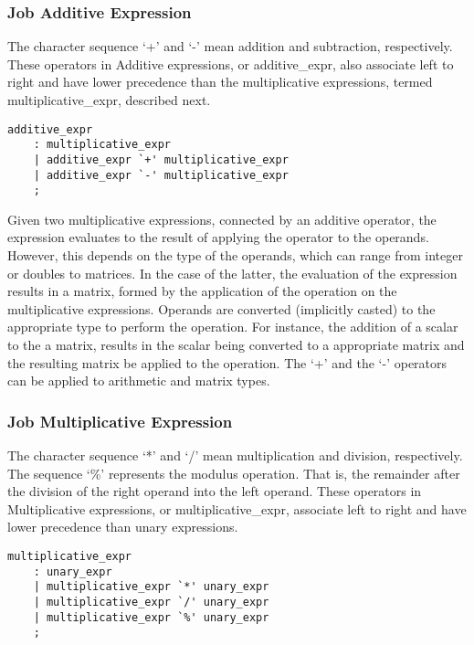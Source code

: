 \documentclass[prodmode,acmtecs]{acmsmall}
\begin{document}

\subsubsection{Job Additive Expression}

The character sequence `+' and `-' mean addition and subtraction, 
respectively. These operators in Additive expressions, or additive\_expr, 
also associate left to right and have lower precedence than the 
multiplicative expressions, termed multiplicative\_expr, described next.

\begin{lstlisting}
additive_expr
	: multiplicative_expr
	| additive_expr `+' multiplicative_expr
	| additive_expr `-' multiplicative_expr
	;
\end{lstlisting}

Given two multiplicative expressions, connected by an additive operator, 
the expression evaluates to the result of applying the operator to the
operands. However, this depends on the type of the operands, which can
range from integer or doubles to matrices. In the case of the latter,
the evaluation of the expression results in a matrix, formed by the 
application of the operation on the multiplicative expressions. Operands 
are converted (implicitly casted) to the appropriate type to perform the
operation. For instance, the addition of a scalar to the a matrix, results in 
the scalar being converted to a appropriate matrix and the resulting matrix
be applied to the operation. The `+' and the `-' operators can be applied 
to arithmetic and matrix types.
\medskip

\subsubsection{Job Multiplicative Expression}

The character sequence `*' and `/' mean multiplication and division, 
respectively. The sequence `\%' represents the modulus operation. That
is, the remainder after the division of the right operand into the left
operand. These operators in Multiplicative expressions, or 
multiplicative\_expr, associate left to right and have lower precedence 
than unary expressions.

\begin{lstlisting}
multiplicative_expr
	: unary_expr
	| multiplicative_expr `*' unary_expr
	| multiplicative_expr `/' unary_expr
	| multiplicative_expr `%' unary_expr
	;
\end{lstlisting}
\end{document}
